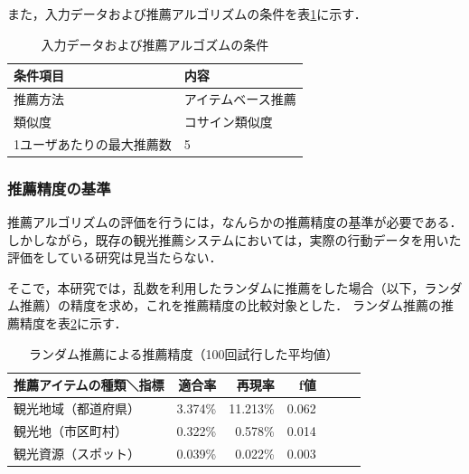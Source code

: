 \documentclass{jsarticle}
\begin{document}
また，入力データおよび推薦アルゴリズムの条件を表\ref{recommendation_condition}に示す．

\begin{table}[!h]
\small
\caption{入力データおよび推薦アルゴズムの条件}
\begin{center}
\begin{tabular}{ll}
\label{recommendation_condition}
条件項目    & 内容 \\ \hline
推薦方法    & アイテムベース推薦 \\
類似度      & コサイン類似度 \\
1ユーザあたりの最大推薦数 & 5 \\
\end{tabular}
\end{center}
\end{table}



\subsubsection{推薦精度の基準}

推薦アルゴリズムの評価を行うには，なんらかの推薦精度の基準が必要である．しかしながら，既存の観光推薦システムにおいては，実際の行動データを用いた評価をしている研究は見当たらない．

そこで，本研究では，乱数を利用したランダムに推薦をした場合（以下，ランダム推薦）の精度を求め，これを推薦精度の比較対象とした．
ランダム推薦の推薦精度を表\ref{result_random}に示す．

\begin{table}[!h]
\small
\caption{ランダム推薦による推薦精度（100回試行した平均値）}
\begin{center}
\begin{tabular}{lrrrrrr}
\label{result_random}
推薦アイテムの種類＼指標    & 適合率 & 再現率 & f値 \\ \hline
観光地域（都道府県）        & 3.374\% & 11.213\% & 0.062 \\
観光地（市区町村）          & 0.322\% &  0.578\% & 0.014 \\
観光資源（スポット）        & 0.039\% &  0.022\% & 0.003 \\
\end{tabular}
\end{center}
\end{table}
\end{document}

